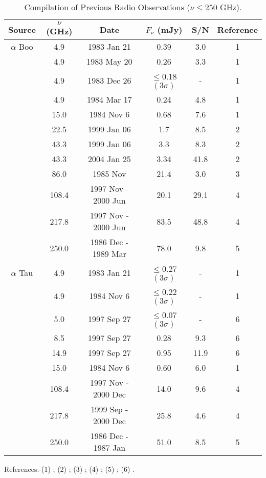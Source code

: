 \begin{table}[!hbt]
\begin{center}
\caption[Compilation of Previous Radio Observations ($\nu \le 250$ GHz)]
{Compilation of Previous Radio Observations ($\nu \le 250$ GHz).}
\begin{tabular}{cccccc}
\hline
\hline
\rule{0pt}{2.5ex}Source & $\nu$ (GHz) & Date &  $F_{\nu}$ (mJy) & S/N & Reference\\
\hline
$\alpha$ Boo &4.9  & 1983 Jan 21 & 0.39 & 3.0 & 1 \\
&4.9  & 1983 May 20 & 0.26 & 3.3& 1 \\
&4.9  & 1983 Dec 26 & $\le$0.18$(3\sigma)$&- & 1 \\
&4.9  & 1984 Mar 17 & 0.24  & 4.8& 1 \\
&15.0 & 1984 Nov 6 & 0.68 & 7.6& 1 \\
&22.5  & 1999 Jan 06  &1.7& 8.5& 2 \\
&43.3  & 1999 Jan 06 & 3.3& 8.3& 2 \\
&43.3  & 2004 Jan 25 & 3.34& 41.8& 2 \\
&86.0  & 1985 Nov  & 21.4& 3.0& 3 \\
&108.4  & 1997 Nov - 2000 Jun & 20.1 &29.1 & 4 \\
&217.8 & 1997 Nov - 2000 Jun  & 83.5 &48.8 & 4 \\
&250.0  & 1986 Dec - 1989 Mar  & 78.0 & 9.8& 5 \\
\hline
\rule{0pt}{3ex}    $\alpha$ Tau	&4.9  & 1983 Jan 21 & $\le$0.27$(3\sigma)$&-& 1 \\
&4.9  & 1984 Nov 6 & $\le$0.22$(3\sigma)$&-& 1 \\
&5.0  & 1997 Sep 27 & $\le$0.07$(3\sigma)$	&-& 6 \\
&8.5  & 1997 Sep 27 & 0.28 	&9.3	& 6 \\
&14.9 & 1997 Sep 27 & 0.95 	&11.9	& 6 \\
&15.0 & 1984 Nov 6 & 0.60 	&6.0	& 1 \\
&108.4  & 1997 Nov - 2000 Dec &  14.0  & 9.6& 4 \\
&217.8 & 1999 Sep - 2000 Dec  & 25.8 & 4.6& 4 \\
&250.0  & 1986 Dec - 1987 Jan & 51.0 & 8.5& 5 \\
\hline
\end{tabular}
\label{tab:6.4.1}
\begin{minipage}{13.5cm}
\rule{0pt}{3ex} References.-(1) \cite{drake_1986}; (2) \cite{dehaes_2011}; (3) \cite{altenhoff_1986}; (4) \cite{cohen_2005}; (5) \cite{altenhoff_1994}; (6) \cite{wood_2007}. 
\end{minipage}
\end{center}
\end{table}

